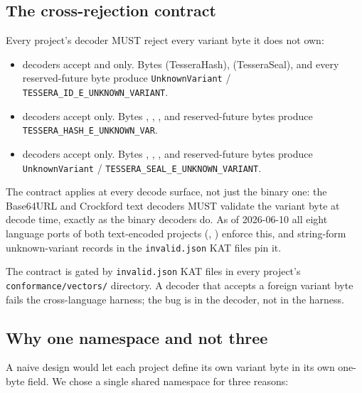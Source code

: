 \subsection{The cross-rejection contract}

Every project's decoder MUST reject every variant byte it does not own:

\begin{itemize}
\item \tesseraid{} decoders accept  and  only. Bytes  (TesseraHash),  (TesseraSeal), and every reserved-future byte produce \texttt{UnknownVariant} / \texttt{TESSERA\_ID\_E\_UNKNOWN\_VARIANT}.
\item \tesserahash{} decoders accept  only. Bytes , , , and reserved-future bytes produce \texttt{TESSERA\_HASH\_E\_UNKNOWN\_VAR}.
\item \tesseraseal{} decoders accept  only. Bytes , , , and reserved-future bytes produce \texttt{UnknownVariant} / \texttt{TESSERA\_SEAL\_E\_UNKNOWN\_VARIANT}.
\end{itemize}

The contract applies at every decode surface, not just the binary one: the Base64URL and Crockford text decoders MUST validate the variant byte at decode time, exactly as the binary decoders do. As of 2026-06-10 all eight language ports of both text-encoded projects (\tesseraid{}, \tesserahash{}) enforce this, and string-form unknown-variant records in the \texttt{invalid.json} KAT files pin it.

The contract is gated by \texttt{invalid.json} KAT files in every project's \texttt{conformance/vectors/} directory. A decoder that accepts a foreign variant byte fails the cross-language harness; the bug is in the decoder, not in the harness.

\subsection{Why one namespace and not three}

A naive design would let each project define its own variant byte in its own one-byte field. We chose a single shared namespace for three reasons:

